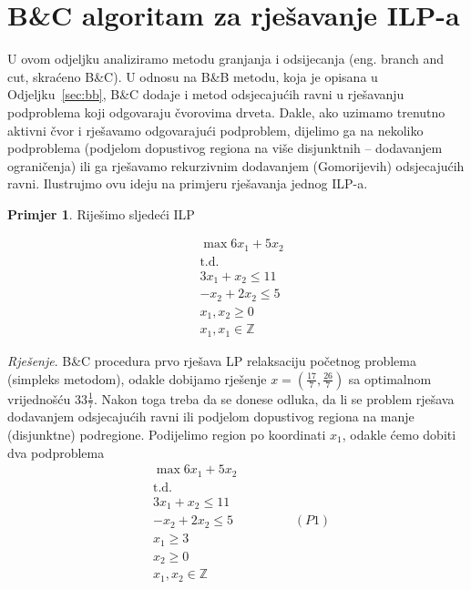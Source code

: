\documentclass[b5paper, utf8, 11pt, colorlinks]{book}
\theoremstyle{definition}
\newtheorem{primjer}{Primjer}[chapter]
\begin{document}
\section{B\&C algoritam za rješavanje ILP-a}
U ovom odjeljku analiziramo metodu granjanja i odsijecanja (eng. branch and cut, skraćeno B\&C). U odnosu na B\&B metodu, koja je opisana u Odjeljku~\ref{sec:bb}, B\&C dodaje  i metod odsjecajućih ravni u rješavanju  podproblema koji odgovaraju čvorovima drveta. Dakle, ako  uzimamo trenutno aktivni čvor i rješavamo odgovarajući podproblem, dijelimo ga na nekoliko podproblema (podjelom dopustivog regiona na više disjunktnih -- dodavanjem ograničenja) ili ga rješavamo rekurzivnim dodavanjem (Gomorijevih) odsjecajućih ravni. Ilustrujmo ovu ideju na primjeru rješavanja jednog ILP-a.
\begin{primjer} 
	Riješimo sljedeći ILP
\end{primjer}
\begin{align*}
    &\max 6 x_1 + 5 x_2 \\
    &  \mbox{t.d. } \\
    & 3x_1 + x_2 \leq 11 \\
    & - x_2 + 2 x_2 \leq 5 \\
    & x_1, x_2 \geq 0 \\
    & x_1, x_1 \in \mathbb{Z}
\end{align*}

\emph{Rješenje}. B\&C procedura prvo rješava LP relaksaciju početnog problema (simpleks metodom), odakle dobijamo rješenje $x=(\frac{17}{7}, \frac{26}{7})$
sa optimalnom vrijednošću $33\frac{1}{7}$. Nakon toga treba da se donese odluka, da li se problem rješava dodavanjem odsjecajućih ravni ili podjelom dopustivog regiona na manje (disjunktne) podregione. Podijelimo region po koordinati $x_1$, odakle ćemo dobiti dva podproblema 
\begin{align*}
    &\max 6 x_1 + 5 x_2 \\
     &  \mbox{t.d. } \\
    & 3x_1 + x_2 \leq 11 \\
    & - x_2 + 2 x_2 \leq 5 \hspace{2cm} (P1) \\
    & x_1 \geq 3 \\
    & x_2 \geq 0 \\
    & x_1, x_2 \in \mathbb{Z}
\end{align*}
\end{document}
